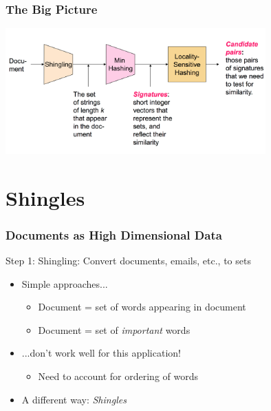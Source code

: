 \documentclass[svgnames]{beamer}
\begin{document}
  
\begin{frame} \frametitle{The Big Picture}

\includegraphics[width=10cm]{overall}

\end{frame}

  
\section{Shingles}

  
\begin{frame} \frametitle{Documents as High Dimensional Data}

\begin{block}{Step 1:}
Shingling: Convert documents, emails, etc., to sets
\end{block}

\begin{itemize}
\item Simple approaches...
   \begin{itemize}
   \item Document = set of words appearing in document
   \item Document = set of {\it important} words
   \end{itemize}
\item ...don’t work well for this application!
   \begin{itemize}
   \item Need to account for ordering of words
   \end{itemize}

\item A different way: \emph{Shingles}
\end{itemize}

\end{frame}

  
\end{document}
